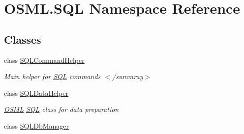 \hypertarget{namespaceOSML_1_1SQL}{}\section{O\+S\+M\+L.\+S\+QL Namespace Reference}
\label{namespaceOSML_1_1SQL}
\subsection*{Classes}
\begin{DoxyCompactItemize}
\item 
class \mbox{\hyperlink{classOSML_1_1SQL_1_1SQLCommandHelper}{S\+Q\+L\+Command\+Helper}}
\begin{DoxyCompactList}\small\item\em Main helper for \mbox{\hyperlink{namespaceOSML_1_1SQL}{S\+QL}} commands $<$/summray$>$ \end{DoxyCompactList}\item 
class \mbox{\hyperlink{classOSML_1_1SQL_1_1SQLDataHelper}{S\+Q\+L\+Data\+Helper}}
\begin{DoxyCompactList}\small\item\em \mbox{\hyperlink{namespaceOSML}{O\+S\+ML}} \mbox{\hyperlink{namespaceOSML_1_1SQL}{S\+QL}} class for data preparation \end{DoxyCompactList}\item 
class \mbox{\hyperlink{classOSML_1_1SQL_1_1SQLDbManager}{S\+Q\+L\+Db\+Manager}}
\end{DoxyCompactItemize}
